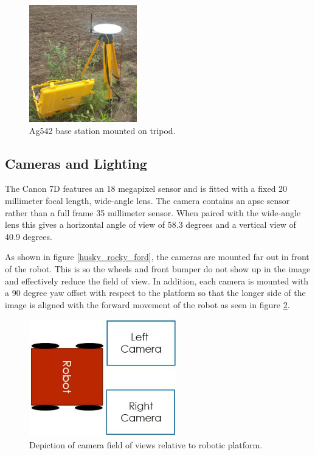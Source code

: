 \begin{figure}
	\centering
    \includegraphics[height=2in]{figures/sunflower_base_cropped.jpg}
    \caption[Base station with tripod]{Ag542 base station mounted on tripod.}
    \label{base_station}
\end{figure}

\subsection{Cameras and Lighting}

The Canon 7D features an 18 megapixel sensor and is fitted with a fixed 20 millimeter focal length, wide-angle lens.  The camera contains an \ac{apsc} sensor rather than a full frame 35 millimeter sensor. When paired with the wide-angle lens this gives a horizontal angle of view of 58.3 degrees and a vertical view of 40.9 degrees.
  
As shown in figure \ref{husky_rocky_ford}, the cameras are mounted far out in front of the robot.  This is so the wheels and front bumper do not show up in the image and effectively reduce the field of view.  In addition, each camera is mounted with a 90 degree yaw offset with respect to the platform so that the longer side of the image is aligned with the forward movement of the robot as seen in figure \ref{figure:image_fov}.  

\begin{figure}
	\centering
    \includegraphics[height=2in]{figures/camera_directions.jpg}
    \caption[Camera field of view]{Depiction of camera field of views relative to robotic platform.}
    \label{figure:image_fov}
\end{figure}

